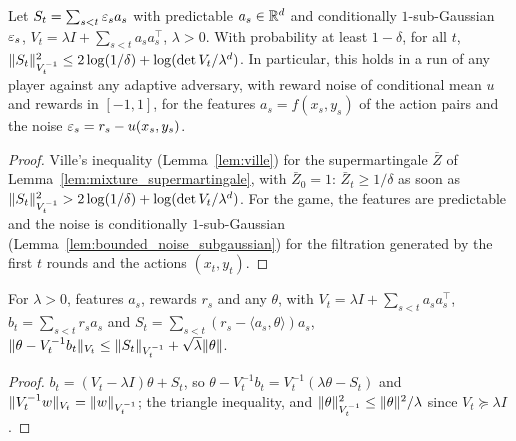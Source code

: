 \begin{lemma}
  \label{lem:self_normalized}
  \leanok
  Let $S_t = \sum_{s < t} \varepsilon_s a_s$ with predictable $a_s \in \mathbb{R}^d$ and conditionally
  $1$-sub-Gaussian $\varepsilon_s$, $V_t = \lambda I + \sum_{s < t} a_s a_s^\top$, $\lambda > 0$. With
  probability at least $1 - \delta$, for all $t$,
  $\lVert S_t \rVert^2_{V_t^{-1}} \le 2 \log(1/\delta) + \log(\det V_t/\lambda^d)$. In particular, this
  holds in a run of any player against any adaptive adversary, with reward noise of conditional
  mean $u$ and rewards in $[-1, 1]$, for the features $a_s = f(x_s, y_s)$ of the action pairs and
  the noise $\varepsilon_s = r_s - u(x_s, y_s)$.
\end{lemma}

\begin{proof}
  \leanok
  Ville's inequality (Lemma~\ref{lem:ville}) for the supermartingale $\bar Z$ of
  Lemma~\ref{lem:mixture_supermartingale}, with $\bar Z_0 = 1$: $\bar Z_t \ge 1/\delta$ as soon as
  $\lVert S_t \rVert^2_{V_t^{-1}} > 2 \log(1/\delta) + \log(\det V_t/\lambda^d)$. For the game, the
  features are predictable and the noise is conditionally $1$-sub-Gaussian
  (Lemma~\ref{lem:bounded_noise_subgaussian}) for the filtration generated by the first $t$ rounds
  and the actions $(x_t, y_t)$.
\end{proof}

\begin{lemma}
  \label{lem:ridge_error}
  \leanok
  For $\lambda > 0$, features $a_s$, rewards $r_s$ and any $\theta$, with
  $V_t = \lambda I + \sum_{s < t} a_s a_s^\top$, $b_t = \sum_{s < t} r_s a_s$ and
  $S_t = \sum_{s < t} (r_s - \langle a_s, \theta\rangle) a_s$,
  $\lVert \theta - V_t^{-1} b_t \rVert_{V_t} \le \lVert S_t \rVert_{V_t^{-1}} + \sqrt\lambda \lVert \theta \rVert$.
\end{lemma}

\begin{proof}
  \leanok
  $b_t = (V_t - \lambda I)\theta + S_t$, so $\theta - V_t^{-1} b_t = V_t^{-1}(\lambda \theta - S_t)$
  and $\lVert V_t^{-1} w \rVert_{V_t} = \lVert w \rVert_{V_t^{-1}}$; the triangle inequality, and
  $\lVert \theta \rVert^2_{V_t^{-1}} \le \lVert \theta \rVert^2/\lambda$ since $V_t \succeq \lambda I$.
\end{proof}

